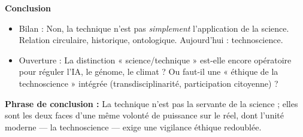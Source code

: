 \documentclass[11pt]{article}
\begin{document}
\begin{exoresolu}
    \textbf{Conclusion}
    \begin{itemize}
        \item Bilan : Non, la technique n'est pas \emph{simplement} l'application de la science. Relation circulaire, historique, ontologique. Aujourd'hui : technoscience.
        \item Ouverture : La distinction « science/technique » est-elle encore opératoire pour réguler l'IA, le génome, le climat ? Ou faut-il une « éthique de la technoscience » intégrée (transdisciplinarité, participation citoyenne) ?
    \end{itemize}
    \textbf{Phrase de conclusion :} \guillemotleft La technique n'est pas la servante de la science ; elles sont les deux faces d'une même volonté de puissance sur le réel, dont l'unité moderne — la technoscience — exige une vigilance éthique redoublée. \guillemotright
\end{exoresolu}
\end{document}
